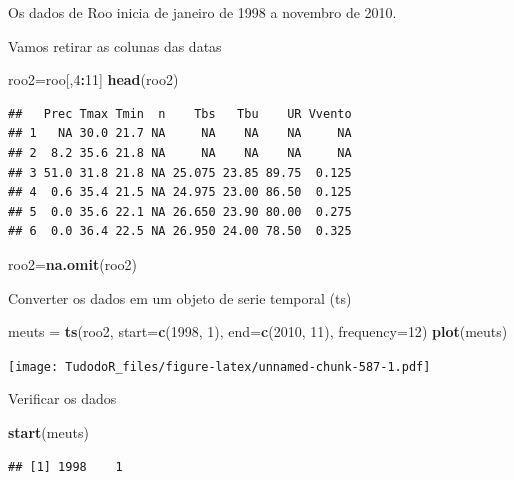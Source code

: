 \documentclass[
]{book}
\newenvironment{Shaded}{\begin{snugshade}}{\end{snugshade}}
\newcommand{\DataTypeTok}[1]{\textcolor[rgb]{0.13,0.29,0.53}{#1}}
\newcommand{\DecValTok}[1]{\textcolor[rgb]{0.00,0.00,0.81}{#1}}
\newcommand{\KeywordTok}[1]{\textcolor[rgb]{0.13,0.29,0.53}{\textbf{#1}}}
\newcommand{\NormalTok}[1]{#1}
\newcommand{\OperatorTok}[1]{\textcolor[rgb]{0.81,0.36,0.00}{\textbf{#1}}}
\newcommand{\StringTok}[1]{\textcolor[rgb]{0.31,0.60,0.02}{#1}}
\begin{document}
Os dados de Roo inicia de janeiro de 1998 a novembro de 2010.

Vamos retirar as colunas das datas

\begin{Shaded}
\begin{Highlighting}[]
\NormalTok{roo2=roo[,}\DecValTok{4}\OperatorTok{:}\DecValTok{11}\NormalTok{]}
\KeywordTok{head}\NormalTok{(roo2)}
\end{Highlighting}
\end{Shaded}

\begin{verbatim}
##   Prec Tmax Tmin  n    Tbs   Tbu    UR Vvento
## 1   NA 30.0 21.7 NA     NA    NA    NA     NA
## 2  8.2 35.6 21.8 NA     NA    NA    NA     NA
## 3 51.0 31.8 21.8 NA 25.075 23.85 89.75  0.125
## 4  0.6 35.4 21.5 NA 24.975 23.00 86.50  0.125
## 5  0.0 35.6 22.1 NA 26.650 23.90 80.00  0.275
## 6  0.0 36.4 22.5 NA 26.950 24.00 78.50  0.325
\end{verbatim}

\begin{Shaded}
\begin{Highlighting}[]
\NormalTok{roo2=}\KeywordTok{na.omit}\NormalTok{(roo2)}
\end{Highlighting}
\end{Shaded}

Converter os dados em um objeto de serie temporal (ts)

\begin{Shaded}
\begin{Highlighting}[]
\NormalTok{meuts =}\StringTok{ }\KeywordTok{ts}\NormalTok{(roo2, }\DataTypeTok{start=}\KeywordTok{c}\NormalTok{(}\DecValTok{1998}\NormalTok{, }\DecValTok{1}\NormalTok{), }\DataTypeTok{end=}\KeywordTok{c}\NormalTok{(}\DecValTok{2010}\NormalTok{, }\DecValTok{11}\NormalTok{), }\DataTypeTok{frequency=}\DecValTok{12}\NormalTok{) }
\KeywordTok{plot}\NormalTok{(meuts)}
\end{Highlighting}
\end{Shaded}

\texttt{[image: TudodoR\_files/figure-latex/unnamed-chunk-587-1.pdf]}

Verificar os dados

\begin{Shaded}
\begin{Highlighting}[]
\KeywordTok{start}\NormalTok{(meuts)}
\end{Highlighting}
\end{Shaded}

\begin{verbatim}
## [1] 1998    1
\end{verbatim}
\end{document}
